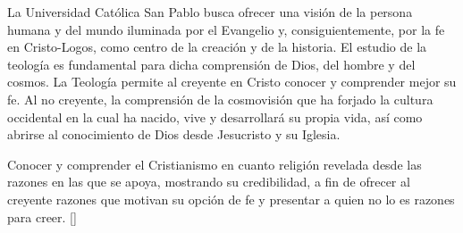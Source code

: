 \begin{syllabus}


\begin{justification}
La Universidad Católica San Pablo busca ofrecer una visión de la persona humana y del mundo iluminada por el Evangelio y, consiguientemente, por la fe en Cristo-Logos, como centro de la creación y de la historia. El estudio de la teología es fundamental para dicha comprensión de Dios, del hombre y del cosmos.
La Teología permite al creyente en Cristo conocer y comprender mejor su fe. Al no creyente, la comprensión de la cosmovisión que ha forjado la cultura occidental en la cual ha nacido, vive y desarrollará su propia vida, así como abrirse al conocimiento de Dios desde Jesucristo y su Iglesia.
\end{justification}

\begin{goals}
\item Conocer y comprender el Cristianismo en cuanto religión revelada desde las razones en las que se apoya, mostrando su credibilidad, a fin de ofrecer al creyente razones que motivan su opción de fe y presentar a quien no lo es razones para creer. [\Familiarity]
\end{goals}

\begin{outcomes}
    \item {}
    \item {}
    \item {}
\end{outcomes}

\begin{competences}
    \item {}
    \item {}
    \item {}
    \item {}
    \item {}
\end{competences}


\end{syllabus}
